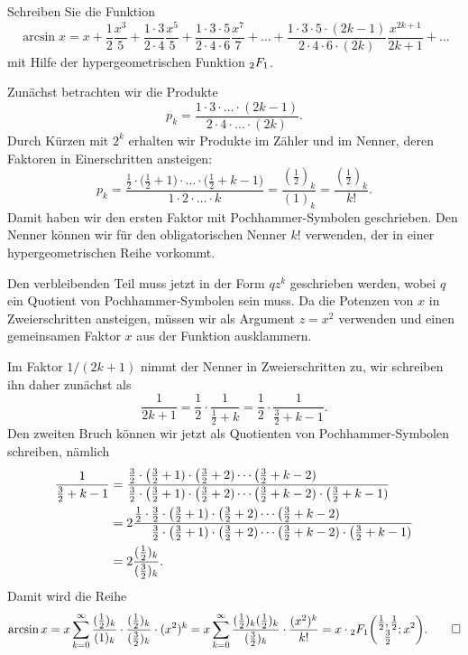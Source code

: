 Schreiben Sie die Funktion
\[
\arcsin x
=
x
+
\frac{1}{2} \frac{x^3}{5}
+
\frac{1\cdot 3}{2\cdot 4}\frac{x^5}{5}
+
\frac{1\cdot 3\cdot 5}{2\cdot 4\cdot 6}\frac{x^7}{7}
+
\dots
+
\frac{1\cdot 3\cdot 5\cdot (2k-1)}{2\cdot4\cdot 6\cdot (2k)}
\frac{x^{2k+1}}{2k+1}
+
\dots
\]
mit Hilfe der hypergeometrischen Funktion $\mathstrut_2F_1$.

\begin{loesung}
Zunächst betrachten wir die Produkte
\[
p_k
=
\frac{1\cdot 3\cdot \ldots \cdot (2k-1)}{2\cdot 4\cdot\ldots\cdot (2k)}.
\]
Durch Kürzen mit $2^k$ erhalten wir Produkte im Zähler und im Nenner, deren
Faktoren in Einerschritten ansteigen:
\[
p_k
=
\frac{
\frac12\cdot
\bigl(
\frac12+1\bigr)\cdot\ldots\cdot\bigl(\frac12+k-1\bigr)
}{
1\cdot 2\cdot \ldots \cdot k
}
=
\frac{(\frac12)_k}{(1)_k}
=
\frac{(\frac12)_k}{k!}.
\]
Damit haben wir den ersten Faktor mit Pochhammer-Symbolen geschrieben.
Den Nenner können wir für den obligatorischen Nenner $k!$ verwenden,
der in einer hypergeometrischen Reihe vorkommt.

Den verbleibenden Teil muss jetzt in der Form $qz^k$ geschrieben werden,
wobei $q$ ein Quotient von Pochhammer-Symbolen sein muss.
Da die Potenzen von $x$ in Zweierschritten ansteigen, müssen wir als
Argument $z=x^2$ verwenden und einen gemeinsamen Faktor $x$ aus der
Funktion ausklammern.

Im Faktor $1/(2k+1)$ nimmt der Nenner in Zweierschritten zu, wir schreiben
ihn daher zunächst als
\[
\frac{1}{2k+1}
=
\frac{1}{2}\cdot \frac{1}{\frac12+k}
=
\frac{1}{2}\cdot\frac{1}{\frac32+k-1}.
\]
Den zweiten Bruch können wir jetzt als Quotienten von Pochhammer-Symbolen
schreiben, nämlich
\begin{align*}
\frac{1}{\frac32+k-1}
&=
\frac{
\frac32
\cdot
\bigl(\frac32+1)
\cdot
\bigl(\frac32+2)
\cdots
\bigl(\frac32+k-2)
\phantom{
\mathstrut
\cdot
\bigl(\frac32+k-1)
}
}{
\frac32
\cdot
\bigl(\frac32+1)
\cdot
\bigl(\frac32+2)
\cdots
\bigl(\frac32+k-2)
\cdot
\bigl(\frac32+k-1)
}
\\
&=
2
\frac{
\frac12
\cdot
\frac32
\cdot
\bigl(\frac32+1)
\cdot
\bigl(\frac32+2)
\cdots
\bigl(\frac32+k-2)
\phantom{
\mathstrut
\cdot
\bigl(\frac32+k-1)
}
}{
\phantom{
\frac12
\cdot
\mathstrut
}
\frac32
\cdot
\bigl(\frac32+1)
\cdot
\bigl(\frac32+2)
\cdots
\bigl(\frac32+k-2)
\cdot
\bigl(\frac32+k-1)
}
\\
&=
2\frac{(\frac12)_k}{(\frac32)_k}.
\end{align*}
Damit wird die Reihe
\[
\arcsin x
=
x
\sum_{k=0}^\infty
\frac{(\frac12)_k}{(1)_k}
\cdot
\frac{(\frac12)_k}{(\frac32)_k}
\cdot
(x^2)^k
=
x
\sum_{k=0}^\infty
\frac{(\frac12)_k(\frac12)_k}{(\frac32)_k}
\cdot
\frac{(x^2)^k}{k!}
=
x\cdot
\mathstrut_2F_1\biggl(
\begin{matrix}
\frac12,\frac12\\ \frac32
\end{matrix}
;x^2
\biggr).
\qedhere
\]
\end{loesung}
